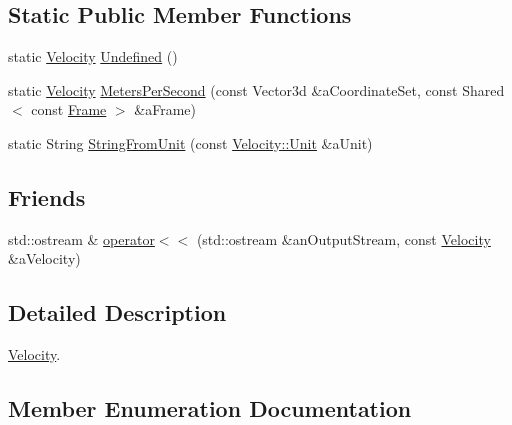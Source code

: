 \subsection*{Static Public Member Functions}
\begin{DoxyCompactItemize}
\item 
static \hyperlink{classlibrary_1_1physics_1_1coord_1_1_velocity}{Velocity} \hyperlink{classlibrary_1_1physics_1_1coord_1_1_velocity_ae6480807520330e282b712805aa4fea5}{Undefined} ()
\item 
static \hyperlink{classlibrary_1_1physics_1_1coord_1_1_velocity}{Velocity} \hyperlink{classlibrary_1_1physics_1_1coord_1_1_velocity_ae00ee3d929b00160789cf33dcb448ae3}{Meters\+Per\+Second} (const Vector3d \&a\+Coordinate\+Set, const Shared$<$ const \hyperlink{classlibrary_1_1physics_1_1coord_1_1_frame}{Frame} $>$ \&a\+Frame)
\item 
static String \hyperlink{classlibrary_1_1physics_1_1coord_1_1_velocity_ad9a3d2d5759384f513f7790534e620a3}{String\+From\+Unit} (const \hyperlink{classlibrary_1_1physics_1_1coord_1_1_velocity_a8bbc811932c454dbe0ab8b56f1b2c0b3}{Velocity\+::\+Unit} \&a\+Unit)
\end{DoxyCompactItemize}
\subsection*{Friends}
\begin{DoxyCompactItemize}
\item 
std\+::ostream \& \hyperlink{classlibrary_1_1physics_1_1coord_1_1_velocity_ab3987a176df736aa7fa50aa763ed068b}{operator$<$$<$} (std\+::ostream \&an\+Output\+Stream, const \hyperlink{classlibrary_1_1physics_1_1coord_1_1_velocity}{Velocity} \&a\+Velocity)
\end{DoxyCompactItemize}


\subsection{Detailed Description}
\hyperlink{classlibrary_1_1physics_1_1coord_1_1_velocity}{Velocity}. 

\subsection{Member Enumeration Documentation}
\mbox{\label{classlibrary_1_1physics_1_1coord_1_1_velocity_a8bbc811932c454dbe0ab8b56f1b2c0b3}} 
